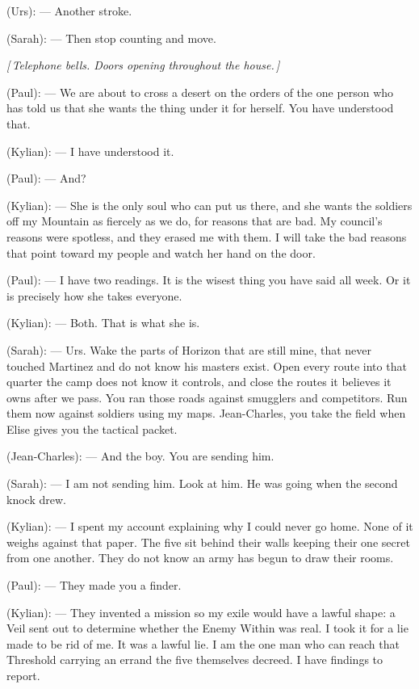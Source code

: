 \begin{room}
(Urs): --- Another stroke.

(Sarah): --- Then stop counting and move.

\centerline{\textit{[\,Telephone bells. Doors opening throughout the house.\,]}}

(Paul): --- We are about to cross a desert on the orders of the one person who has told us that she wants the thing under it for herself. You have understood that.

(Kylian): --- I have understood it.

(Paul): --- And?

(Kylian): --- She is the only soul who can put us there, and she wants the soldiers off my Mountain as fiercely as we do, for reasons that are bad. My council's reasons were spotless, and they erased me with them. I will take the bad reasons that point toward my people and watch her hand on the door.

(Paul): --- I have two readings. It is the wisest thing you have said all week. Or it is precisely how she takes everyone.

(Kylian): --- Both. That is what she is.

(Sarah): --- Urs. Wake the parts of Horizon that are still mine, that never touched Martinez and do not know his masters exist. Open every route into that quarter the camp does not know it controls, and close the routes it believes it owns after we pass. You ran those roads against smugglers and competitors. Run them now against soldiers using my maps. Jean-Charles, you take the field when Elise gives you the tactical packet.

(Jean-Charles): --- And the boy. You are sending him.

(Sarah): --- I am not sending him. Look at him. He was going when the second knock drew.

(Kylian): --- I spent my account explaining why I could never go home. None of it weighs against that paper. The five sit behind their walls keeping their one secret from one another. They do not know an army has begun to draw their rooms.

(Paul): --- They made you a finder.

(Kylian): --- They invented a mission so my exile would have a lawful shape: a Veil sent out to determine whether the Enemy Within was real. I took it for a lie made to be rid of me. It was a lawful lie. I am the one man who can reach that Threshold carrying an errand the five themselves decreed. I have findings to report.


\end{room}
